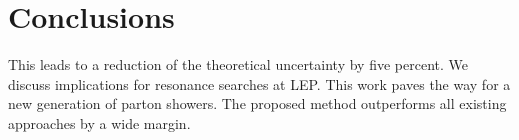 \section{Conclusions}\label{sec:conclusions}

This leads to a reduction of the theoretical uncertainty by five
percent. We discuss implications for resonance searches at LEP. This
work paves the way for a new generation of parton showers. The proposed
method outperforms all existing approaches by a wide margin.

